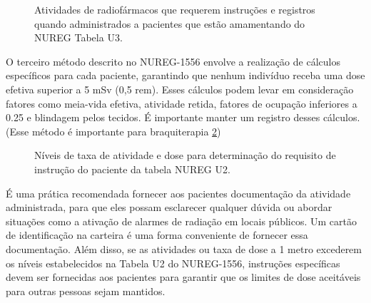 \documentclass[11pt,a4paper]{article}
\begin{document}
		\begin{figure}[!h]
			\centering
			\caption{Atividades de radiofármacos que requerem instruções e registros quando administrados a pacientes que estão amamentando do NUREG Tabela U3.}
			\label{fig:prCrprAtividadesMedNuciterio}
		\end{figure}

	O terceiro método descrito no NUREG-1556 envolve a realização de cálculos específicos para cada paciente, garantindo que nenhum indivíduo receba uma dose efetiva superior a 5 mSv (0,5 rem). Esses cálculos podem levar em consideração fatores como meia-vida efetiva, atividade retida, fatores de ocupação inferiores a 0.25 e blindagem pelos tecidos. É importante manter um registro desses cálculos. (Esse método é importante para braquiterapia \ref{fig:prAtidadeBraq})

	\begin{figure}[!h]
		\centering
		\caption{Níveis de taxa de atividade e dose para determinação do requisito de instrução do paciente da tabela NUREG U2.}
		\label{fig:prAtidadeBraq}
	\end{figure}

	É uma prática recomendada fornecer aos pacientes documentação da atividade administrada, para que eles possam esclarecer qualquer dúvida ou abordar situações como a ativação de alarmes de radiação em locais públicos. Um cartão de identificação na carteira é uma forma conveniente de fornecer essa documentação. Além disso, se as atividades ou taxa de dose a 1 metro excederem os níveis estabelecidos na Tabela U2 do NUREG-1556, instruções específicas devem ser fornecidas aos pacientes para garantir que os limites de dose aceitáveis para outras pessoas sejam mantidos.
\end{document}
